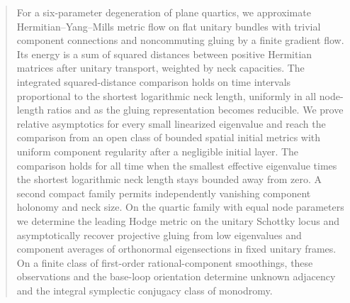 

\begin{abstract}
For a six-parameter degeneration of plane quartics, we approximate
Hermitian--Yang--Mills metric flow on flat unitary bundles with trivial
component connections and noncommuting gluing by a finite gradient
flow. Its energy is a sum of squared distances between positive
Hermitian matrices after unitary transport, weighted by neck capacities.
The integrated squared-distance comparison holds on time intervals
proportional to the shortest logarithmic neck length, uniformly in all
node-length ratios and as the gluing representation becomes reducible.
We prove relative asymptotics for every small linearized eigenvalue
and reach the comparison from an open class of bounded spatial initial
metrics with uniform component regularity after a negligible initial
layer. The comparison
holds for all time when the smallest effective eigenvalue times the
shortest logarithmic neck length stays bounded away from zero.
A second compact family permits independently vanishing component
holonomy and neck size. On the quartic family with equal node
parameters we determine the
leading Hodge metric on the unitary Schottky locus and asymptotically
recover projective gluing from low eigenvalues and component averages
of orthonormal eigensections in fixed unitary frames. On a finite class
of first-order rational-component smoothings, these observations and
the base-loop orientation determine unknown adjacency and the integral
symplectic conjugacy class of monodromy.
\end{abstract}
\maketitle













